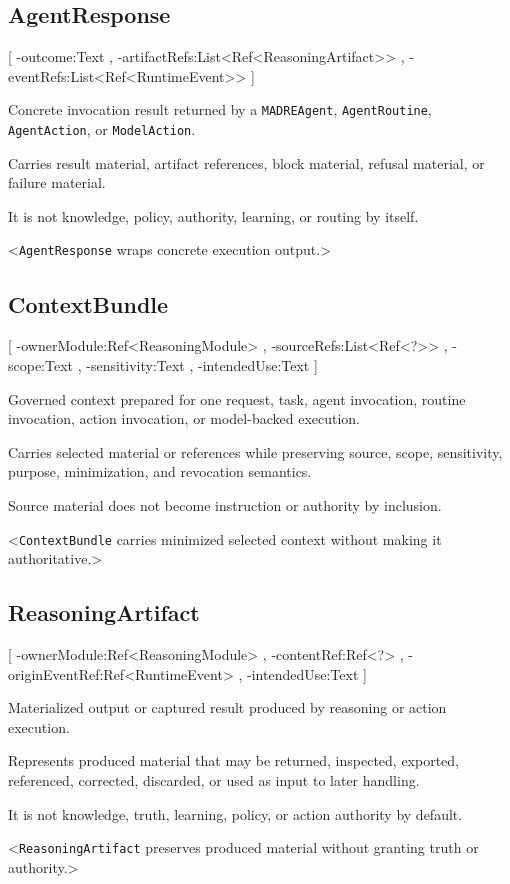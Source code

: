 \documentclass[11pt]{report}
\begin{document}
\subsection{AgentResponse}
[
	\UMLAt-outcome:Text ,
	\UMLAt-artifactRefs:List<Ref<ReasoningArtifact>> ,
	\UMLAt-eventRefs:List<Ref<RuntimeEvent>>
]{%
	\item[] Concrete invocation result returned by a \texttt{MADREAgent}, \texttt{AgentRoutine}, \texttt{AgentAction}, or \texttt{ModelAction}.
	\item[] Carries result material, artifact references, block material, refusal material, or failure material.
	\item[] It is not knowledge, policy, authority, learning, or routing by itself.
}<\texttt{AgentResponse} wraps concrete execution output.>

\subsection{ContextBundle}
[
	\UMLAt-ownerModule:Ref<ReasoningModule> ,
	\UMLAt-sourceRefs:List<Ref<?>> ,
	\UMLAt-scope:Text ,
	\UMLAt-sensitivity:Text ,
	\UMLAt-intendedUse:Text
]{%
	\item[] Governed context prepared for one request, task, agent invocation, routine invocation, action invocation, or model-backed execution.
	\item[] Carries selected material or references while preserving source, scope, sensitivity, purpose, minimization, and revocation semantics.
	\item[] Source material does not become instruction or authority by inclusion.
}<\texttt{ContextBundle} carries minimized selected context without making it authoritative.>

\subsection{ReasoningArtifact}
[
	\UMLAt-ownerModule:Ref<ReasoningModule> ,
	\UMLAt-contentRef:Ref<?> ,
	\UMLAt-originEventRef:Ref<RuntimeEvent> ,
	\UMLAt-intendedUse:Text
]{%
	\item[] Materialized output or captured result produced by reasoning or action execution.
	\item[] Represents produced material that may be returned, inspected, exported, referenced, corrected, discarded, or used as input to later handling.
	\item[] It is not knowledge, truth, learning, policy, or action authority by default.
}<\texttt{ReasoningArtifact} preserves produced material without granting truth or authority.>
\end{document}
